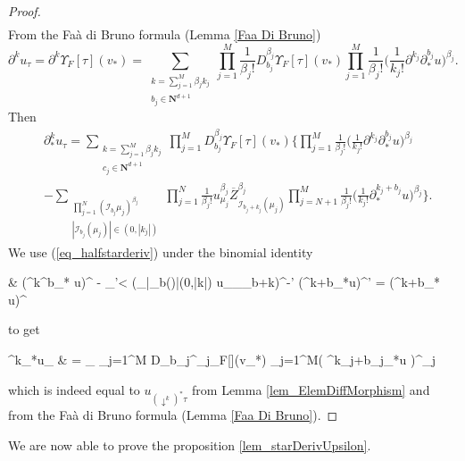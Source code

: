 \documentclass[11pt]{preprint}
\newcommand{\mcI}{\mathcal{I}}
\def\eqref#1{(\ref{#1})}
\newcommand{\bfN}{\mathbf{N}}
\begin{document}
\begin{proof}
\begin{align*}
		\end{align*}	
	From the Faà di Bruno formula (Lemma \ref{Faa Di Bruno})
		$$
		\partial^{k}u_\tau=\partial^{k}\Upsilon_F[\tau](v_*) = \sum_{\substack{k=\sum_{j=1}^M \beta_jk_j    \\ b_j\in\bfN^{d+1}  }} \prod_{j=1}^{M} \frac{1}{\beta_j!} D_{b_j}^{\beta_j}\Upsilon_F[\tau](v_*) \prod_{j=1}^{M}\frac{1}{\beta_j!}\Big(\frac{1}{k_j!}\partial^{k_j} \partial^{b_j}_*u \Big)^{\beta_j}.
		$$
	Then  
		\begin{align*}
		&	\partial_*^{k} u_\tau  = \sum_{\substack{k=\sum_{j=1}^{M} \beta_jk_j  \\ c_j\in\bfN^{d+1}  }} \prod_{j=1}^M D_{b_j}^{\beta_j}\Upsilon_F[\tau](v_*)  \Big\{ \prod_{j=1}^M \frac{1}{\beta_j!}\Big(\frac{1}{k_j!}\partial^{k_j} \partial^{b_j}_*u \Big)^{\beta_j} 
		\\ &	- \sum_{\substack{\prod_{j=1}^N (\mcI_{b_j}\mu_j)^{\beta_j} \\ |\mcI_{b_j}(\mu_j)|\in(0,|k_j|)}}    \prod_{j=1}^N \frac{1}{\beta_j!}  u_{\mu_j}^{\beta_j} \overline Z_{\mcI_{b_j+k_j}(\mu_j)}^{\beta_j} \prod_{j=N+1}^M \frac{1}{\beta_j!} \Big(\frac{1}{k_j!}\partial_*^{k_j+b_j} u\Big)^{\beta_j}   \Big\}.
		\end{align*}		
		We use \eqref{eq_halfstarderiv} under the binomial identity
		\begin{equs}
	&	\big(\partial^k\partial^b_* u\big)^{\beta}
		-
		\sum_{\beta'<\beta} \Big(\sum_{|\mcI_b(\mu)|\in(0,|k|)} u_\mu {}_{\mcI_{b+k}\mu}\Big)^{\beta-\beta'} (\partial^{k+b}_*u)^{\beta'}  %
	 	= 
		(\partial^{k+b}_* u)^\beta 
		\end{equs}
		to get
			\begin{equs}
		\partial^k_*u_{\tau} & = \sum_{\substack{k=\sum_{j=1}^{M} \beta_jk_j   \\ b_j\in\bfN^{d+1}  }} \prod_{j=1}^{M} D_{b_j}^{\beta_j}\Upsilon_F[\tau](v_*)    \prod_{j=1}^{M}\Big( \partial^{k_j+b_j}_*u \Big)^{\beta_j}
		\end{equs}
	which is indeed equal to $u_{(\downarrow^k)^*\tau}$ from Lemma \ref{lem_ElemDiffMorphism} and from the Faà di Bruno formula (Lemma \ref{Faa Di Bruno}).
	\end{proof}
	
	
	We are now able to prove the proposition \ref{lem_starDerivUpsilon}.
	
\end{document}
